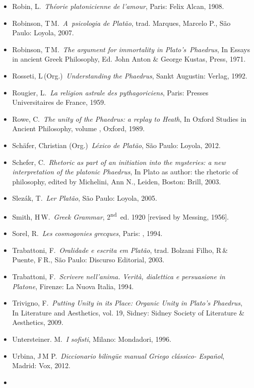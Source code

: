 {\begin{itemize}
\item
  Robin, L.~\emph{Théorie platonicienne de l'amour}, Paris: Felix Alcan,
  1908.
\item
  Robinson, T\,M.~\emph{A~psicologia de Platão}, trad. Marques, Marcelo
  P., São Paulo: Loyola, 2007.
\item
  Robinson, T\,M.~\emph{The argument for immortality in
  Plato's}~\emph{Phaedrus}, In Essays in ancient Greek Philosophy, Ed.
  John Anton \& George Kustas,  Press, 1971.
\item
  Rosseti, L\,(Org.)~\emph{Understanding the Phaedrus}, Sankt Augustin:
  Verlag, 1992.
\item
  Rougier, L.~\emph{La religion astrale des pythagoriciens}, Paris:
  Presses Universitaires de France, 1959.
\item
  Rowe, C.~\emph{The unity of the Phaedrus: a replay to Heath}, In
  Oxford Studies in Ancient Philosophy, volume , Oxford, 1989.
\item
  Schäfer, Christian (Org.)~\emph{Léxico de Platão}, São Paulo: Loyola,
  2012.
\item
  Schefer, C.~\emph{Rhetoric as part of an initiation into the
  mysteries: a new interpretation of the platonic Phaedrus}, In Plato as
  author: the rhetoric of philosophy, edited by Michelini, Ann N.,
  Leiden, Boston: Brill, 2003.
\item
  Slezák, T.~\emph{Ler Platão}, São Paulo: Loyola, 2005.
\item
  Smith, H\,W.~\emph{Greek Grammar}, 2\textsuperscript{nd}~ed. 1920
  [revised by Messing, 1956].
\item
  Sorel, R.~\emph{Les cosmogonies grecques}, Paris: , 1994.
\item
  Trabattoni, F.~\emph{Oralidade e escrita em Platão}, trad. Bolzani
  Filho, R\,\& Puente, F\,R., São Paulo: Discurso Editorial, 2003.
\item
  Trabattoni, F.~\emph{Scrivere nell'anima. Verità, dialettica e
  persuasione in Platone}, Firenze: La Nuova Italia, 1994.
\item
  Trivigno, F.~\emph{Putting Unity in its Place: Organic Unity in
  Plato's Phaedrus}, In Literature and Aesthetics, vol. 19, Sidney:
  Sidney Society of Literature \& Aesthetics, 2009.
\item
  Untersteiner. M.~\emph{I sofisti}, Milano: Mondadori, 1996.
\item
  Urbina, J\,M P.~\emph{Diccionario bilingüe manual Griego clássico-
  Español}, Madrid: Vox, 2012.
\item

\end{itemize}}
